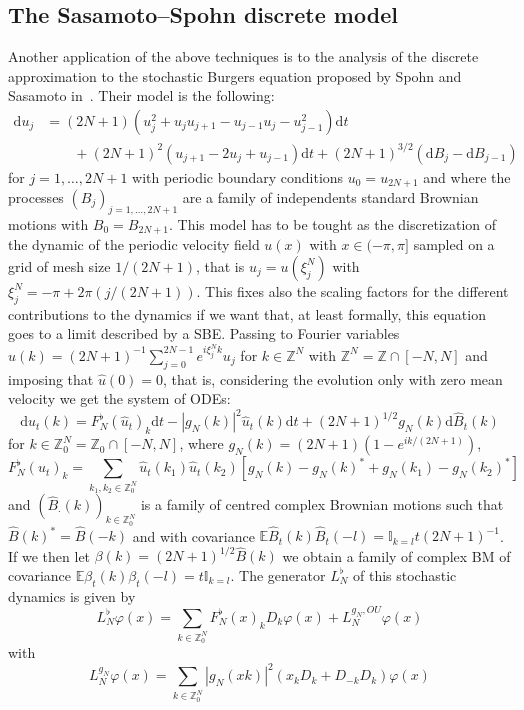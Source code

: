 \documentclass[11pt,a4paper,reqno]{amsart}
\newcommand{\II}{\mathbb{I}}
\newcommand{\ZZ}{\mathbb{Z}}
\newcommand{\expect}{\mathbb{E}}
\newcommand{\dd}{\mathrm{d}}
\begin{document}
\subsection{The Sasamoto--Spohn discrete model}
Another application of the above techniques is to the analysis of the discrete approximation to the stochastic Burgers equation proposed by Spohn and Sasamoto in~\cite{Spohn}. Their model is the following:
\begin{equation}
\label{eq:sasamoto-spohn}
\begin{split}
\dd u_j & = (2N+1) (u_j^2+u_j u_{j+1}-u_{j-1}u_j-u^2_{j-1})\dd t
\\
 & \qquad  + (2N+1)^2(u_{j+1}-2 u_j+u_{j-1})\dd t + (2N+1)^{3/2} (\dd B_j - \dd B_{j-1})
\end{split}
\end{equation}
for $j=1,\dots,2N+1$ with periodic boundary conditions $u_0=u_{2N+1}$ and where the processes $(B_j)_{j=1,\dots,2N+1}$ are a family of independents standard Brownian motions with $B_0=B_{2N+1}$. This model has to be tought as the discretization of the dynamic of the periodic velocity field $u(x)$ with $x\in(-\pi,\pi]$ sampled on a grid of mesh size $1/(2N+1)$,  that is $u_j = u(\xi^N_j)$ with $\xi^N_j = -\pi+2\pi(j/(2N+1))$. This fixes also the scaling factors for the different contributions to the dynamics if we want that, at least formally, this equation goes to a limit described by a SBE. Passing to Fourier variables $\hat u(k) = (2N+1)^{-1}\sum_{j=0}^{2N-1} e^{i \xi^N_j k} u_j$ for $k\in \ZZ^N$ with $\ZZ^N = \ZZ\cap [-N,N]$ and imposing that $\hat u(0)=0$, that is, considering the evolution only with zero mean velocity we get the system of ODEs:
$$
\dd \hat u_t(k) = F^\flat_N(\hat u_t)_k \dd t 
 -  |g_N(k)|^2  \hat u_t(k) \dd t + (2N+1)^{1/2} g_N(k) \dd \hat B_t(k)
$$
for $k\in \ZZ_0^N=\ZZ_0\cap [-N,N]$, where $g_N(k)=(2N+1)(1-e^{i k/(2N+1)})$,
$$
F^\flat_N(u_t)_k = \sum_{k_1,k_2\in\ZZ^N_0} \hat u_t(k_1)\hat u_t(k_2)[ g_N(k)-g_N(k)^*+g_N(k_1)-g_N(k_2)^*]
$$
and $(\hat B_\cdot(k))_{k\in\ZZ_0^N}$ is a family of centred complex Brownian motions such that $\hat B(k)^* = \hat B(-k)$ and with covariance $\expect \hat B_t(k) \hat B_t(-l) = \II_{k=l} t (2N+1)^{-1}$. 
If we then let $\beta(k) = (2N+1)^{1/2} \hat B(k)$ we obtain a family of complex BM of covariance 
$\expect  \beta_t(k)  \beta_t(-l) = t \II_{k=l} $. The generator $L^\flat_N$ of this stochastic dynamics is given by
$$
L^{\flat}_N \varphi( x) = \sum_{k\in\ZZ^N_0} F^\flat_N(x)_k  D_k \varphi( x)+L^{g_N,OU}_N \varphi (x)
$$
with $$ 
L^{g_N}_N \varphi( x) = \sum_{k\in\ZZ^N_0} |g_N(xk)|^2 (x_k D_{k}+ D_{-k}  D_k) \varphi( x)
$$
\end{document}
